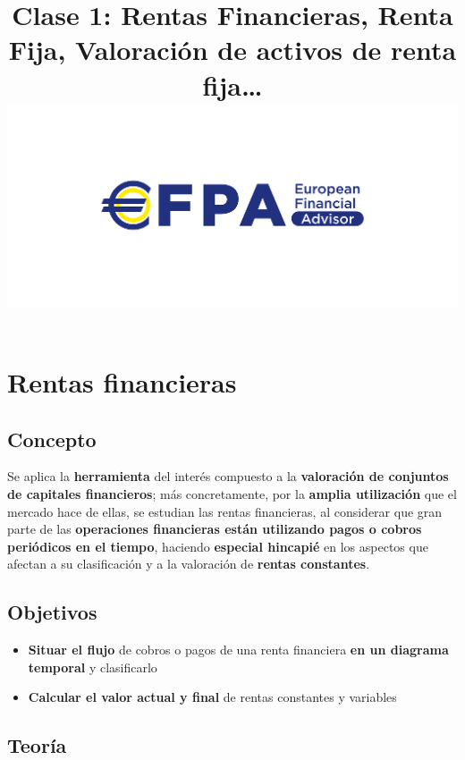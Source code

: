 \documentclass[
  letterpaper,
  DIV=11,
  numbers=noendperiod]{scrartcl}
\title{Clase 1: Rentas Financieras, Renta Fija, Valoración de activos de
renta fija\ldots{} \includegraphics{images/EFA_logo.jpg}}
\author{}
\date{}
\renewcommand*\contentsname{Tabla de contenidos}
\newcommand\contentsname{Tabla de contenidos}
\begin{document}
\maketitle
\ifdefined\Shaded\renewenvironment{Shaded}{\begin{tcolorbox}[boxrule=0pt, sharp corners, borderline west={3pt}{0pt}{shadecolor}, frame hidden, interior hidden, breakable, enhanced]}{\end{tcolorbox}}\fi

\renewcommand*\contentsname{Tabla de contenidos}
{
\hypersetup{linkcolor=}
\setcounter{tocdepth}{3}
\tableofcontents
}
\hypertarget{rentas-financieras}{%
\section{Rentas financieras}\label{rentas-financieras}}

\hypertarget{concepto}{%
\subsection{Concepto}\label{concepto}}

Se aplica la \textbf{herramienta} del interés compuesto a la
\textbf{valoración de conjuntos de capitales financieros}; más
concretamente, por la \textbf{amplia utilización} que el mercado hace de
ellas, se estudian las rentas financieras, al considerar que gran parte
de las \textbf{operaciones financieras están utilizando pagos o cobros
periódicos en el tiempo}, haciendo \textbf{especial hincapié} en los
aspectos que afectan a su clasificación y a la valoración de
\textbf{rentas constantes}.

\hypertarget{objetivos}{%
\subsection{Objetivos}\label{objetivos}}

\begin{itemize}
\item
  \textbf{Situar el flujo} de cobros o pagos de una renta financiera
  \textbf{en un diagrama temporal} y clasificarlo
\item
  \textbf{Calcular el valor actual y final} de rentas constantes y
  variables
\end{itemize}

\hypertarget{teoruxeda}{%
\subsection{Teoría}\label{teoruxeda}}
\end{document}
